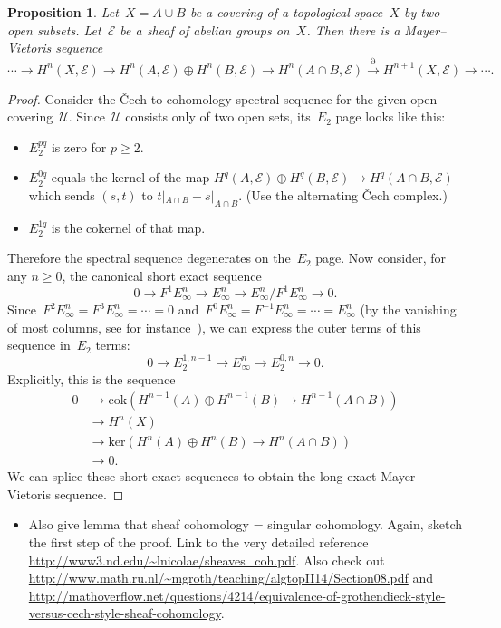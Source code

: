 \documentclass[10pt]{amsart}
\theoremstyle{definition}
\theoremstyle{plain}
\newtheorem{prop}[defn]{Proposition}
\theoremstyle{remark}
\newcommand{\E}{\mathcal{E}}
\newcommand{\U}{\mathcal{U}}
\newcommand{\lra}{\longrightarrow}
\begin{document}
\begin{prop}Let~$X = A \cup B$ be a covering of a topological space~$X$
by two open subsets. Let~$\E$ be a sheaf of abelian groups on~$X$. Then there
is a Mayer--Vietoris sequence
\[ \cdots \lra H^n(X, \E) \lra
  H^n(A, \E) \oplus H^n(B, \E) \lra
  H^n(A \cap B, \E) \stackrel{\partial}{\lra} H^{n+1}(X, \E) \lra \cdots. \]
\end{prop}
\begin{proof}Consider the Čech-to-cohomology spectral sequence for the
given open covering~$\U$. Since~$\U$ consists only of two open sets, its~$E_2$ page looks like this:
\begin{itemize}
\item $E_2^{pq}$ is zero for $p \geq 2$.
\item $E_2^{0q}$ equals the kernel of the map $H^q(A,\E) \oplus H^q(B,\E) \to H^q(A
\cap B,\E)$ which sends $(s,t)$ to $t|_{A \cap B} - s|_{A \cap B}$. (Use the
alternating Čech complex.)
\item $E_2^{1q}$ is the cokernel of that map.
\end{itemize}
Therefore the spectral sequence degenerates on the~$E_2$ page. Now
consider, for any $n \geq 0$, the canonical short exact sequence
\[ 0 \longrightarrow F^1 E_\infty^n \longrightarrow E_\infty^n
\longrightarrow E_\infty^n/F^1 E_\infty^n \longrightarrow 0. \]
Since~$F^2 E_\infty^n = F^3 E_\infty^n = \cdots = 0$ and~$F^0 E_\infty^n =
F^{-1} E_\infty^n = \cdots = E_\infty^n$ (by the vanishing of most
columns, see for instance~\cite{greenberg}),
we can express the outer terms of this sequence in~$E_2$ terms:
\[ 0 \longrightarrow E_2^{1,n-1} \longrightarrow E_\infty^n
\longrightarrow E_2^{0,n} \longrightarrow 0. \]
Explicitly, this is the sequence
\begin{align*}
  0 &\longrightarrow \mathrm{cok}(H^{n-1}(A) \oplus H^{n-1}(B) \to
H^{n-1}(A \cap B)) \\
  &\longrightarrow H^n(X) \\
  &\longrightarrow \mathrm{ker}(H^n(A) \oplus H^n(B) \to H^n(A \cap B)) \\
  &\longrightarrow 0.
\end{align*}
We can splice these short exact sequences to obtain the long exact
Mayer--Vietoris sequence.
\end{proof}

\begin{itemize}
\item Also give lemma that sheaf cohomology = singular cohomology. Again,
sketch the first step of the proof. Link to the very detailed reference
\url{http://www3.nd.edu/~lnicolae/sheaves_coh.pdf}. Also check out
\url{http://www.math.ru.nl/~mgroth/teaching/algtopII14/Section08.pdf} and
\url{http://mathoverflow.net/questions/4214/equivalence-of-grothendieck-style-versus-cech-style-sheaf-cohomology}.
\end{itemize}
\end{document}

